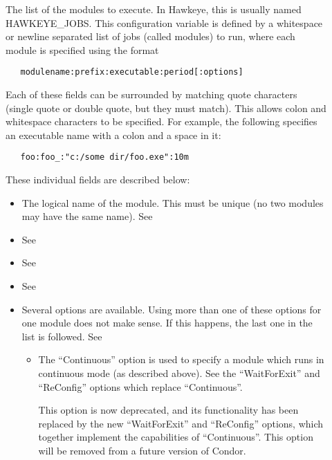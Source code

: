 \begin{description}

\item[]
\label{param:StartdCronJobs}
  The list of the modules to execute.  In Hawkeye, this is usually
  named HAWKEYE\_JOBS.
  This configuration variable is defined by
  a whitespace or newline separated list of jobs (called modules) to run,
  where each module is specified using the format
\begin{verbatim}
   modulename:prefix:executable:period[:options]
\end{verbatim}
  Each of these fields can be surrounded by matching quote characters
  (single quote or double quote, but they must match).  This allows
  colon and whitespace characters to be specified.  For example, the
  following specifies an executable name with a colon and a space in it:
\begin{verbatim}
   foo:foo_:"c:/some dir/foo.exe":10m
\end{verbatim}
  These individual fields are described below: 
    \begin{itemize}

    \item {} The logical name of the module.  This 
    must be unique (no two modules may have the same name).  See 

    \item {}
    See 

    \item {}
    See 

    \item {}
    See 

   \item Several options are available. Using more than one
   of these options for one module does not make sense.  If this happens,
   the last one in the list is followed. 
   See 

	\begin{itemize}
	\item The ``Continuous'' option is used to specify a module
	which runs in continuous mode (as described above).  See the
	``WaitForExit'' and ``ReConfig'' options which replace
	``Continuous''.

	This option is now deprecated, and its functionality has been
	replaced by the new ``WaitForExit'' and ``ReConfig'' options,
	which together implement the capabilities of ``Continuous''.
	This option will be removed from a future version of Condor.


\end{itemize}
\end{itemize}
\end{description}

